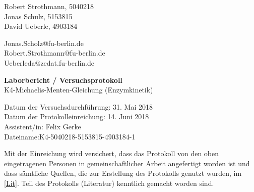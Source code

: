 
\thispagestyle{empty}

\begin{flushleft}
Robert Strothmann, 5040218\\ 
Jonas Schulz, 5153815\\ 
David Ueberle, 4903184\\ 
\end{flushleft}
\vspace*{0.3cm}
Jonas.Scholz@fu-berlin.de\\
Robert.Strothmann@fu-berlin.de\\
Ueberleda@zedat.fu-berlin.de\\
\begin{center}
	\vspace*{1cm}
	\Large
	{ \bfseries Laborbericht / Versuchsprotokoll}\\
	\vspace*{1cm}
	{K4-Michaelis-Menten-Gleichung (Enzymkinetik)}\\
\end{center}
	\vspace*{1cm}
	{Datum der Versuchsdurchführung: 31. Mai 2018}\\
	{Datum der Protokolleinreichung:  14. Juni 2018}\\
	{Assistent/in: Felix Gerke}\\
	{Dateiname:K4-5040218-5153815-4903184-1}	
	\vfill
\begin{flushleft}
Mit der Einreichung wird versichert, dass das Protokoll von den oben eingetragenen Personen in gemeinschaftlicher Arbeit angefertigt worden ist und dass sämtliche Quellen, die zur Erstellung des Protokolls genutzt wurden, im \ref{Lit}. Teil des Protokolls (Literatur) kenntlich gemacht worden sind.
\end{flushleft}

\normalsize
\newpage
%